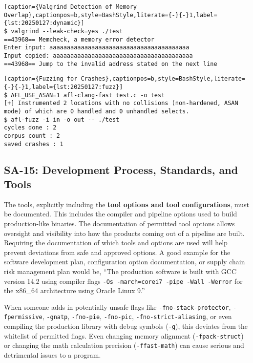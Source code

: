\begin{lstlisting}[caption={Valgrind Detection of Memory Overlap},captionpos=b,style=BashStyle,literate={-}{-}1,label={lst:20250127:dynamic}]
$ valgrind --leak-check=yes ./test
==43968== Memcheck, a memory error detector
Enter input: aaaaaaaaaaaaaaaaaaaaaaaaaaaaaaaaaaaaaaaa
Input copied: aaaaaaaaaaaaaaaaaaaaaaaaaaaaaaaaaaaaaaaa
==43968== Jump to the invalid address stated on the next line
\end{lstlisting}

\begin{lstlisting}[caption={Fuzzing for Crashes},captionpos=b,style=BashStyle,literate={-}{-}1,label={lst:20250127:fuzz}]
$ AFL_USE_ASAN=1 afl-clang-fast test.c -o test
[+] Instrumented 2 locations with no collisions (non-hardened, ASAN mode) of which are 0 handled and 0 unhandled selects.
$ afl-fuzz -i in -o out -- ./test
cycles done : 2
corpus count : 2
saved crashes : 1
\end{lstlisting}

\subsection*{SA-15: Development Process, Standards, and Tools}
The tools, explicitly including the \textbf{tool options and tool configurations}, must be documented. This includes the compiler and pipeline options used to build production-like binaries. The documentation of permitted tool options allows oversight and visibility into how the products coming out of a pipeline are built. Requiring the documentation of which tools and options are used will help prevent deviations from safe and approved options. A good example for the software development plan, configuration option documentation, or supply chain risk management plan would be, ``The production software is built with GCC version 14.2 using compiler flags \texttt{-Os -march=corei7 -pipe -Wall -Werror} for the x86\_64 architecture using Oracle Linux 9.''

When someone adds in potentially unsafe flags like \texttt{-fno-stack-protector}, \texttt{-fpermissive}, \texttt{-gnatp}, \texttt{-fno-pie}, \texttt{-fno-pic}, \texttt{-fno-strict-aliasing}, or even compiling the production library with debug symbols (\texttt{-g}), this deviates from the whitelist of permitted flags. Even changing memory alignment (\texttt{-fpack-struct}) or changing the math calculation precision (\texttt{-ffast-math}) can cause serious and detrimental issues to a program.

